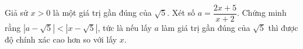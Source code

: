 \begin{ex}
Giả sử $x>0$ là một giá trị gần đúng của $\sqrt5$. Xét số $a=\dfrac{2x+5}{x+2}$. Chứng minh rằng $\left|a-\sqrt5\right|<\left|x-\sqrt5\right|$, tức là nếu lấy $a$ làm giá trị gần đúng của $\sqrt5$ thì được độ chính xác cao hơn so với lấy $x$.
\end{ex}
